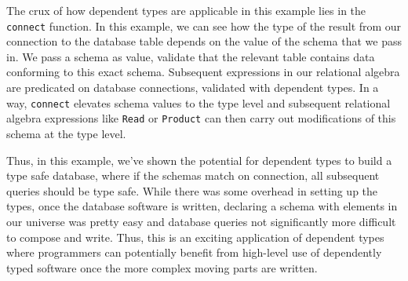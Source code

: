 The crux of how dependent types are applicable in this example lies in the
\texttt{connect} function. In this example, we can see how the type of the
result from our connection to the database table depends on the value of the
schema that we pass in. We pass a schema as value, validate that the relevant
table contains data conforming to this exact schema. Subsequent expressions in
our relational algebra are predicated on database connections, validated with
dependent types. In a way, \texttt{connect} elevates schema values to the type
level and subsequent relational algebra expressions like \texttt{Read} or
\texttt{Product} can then carry out modifications of this schema at the type
level. 

Thus, in this example, we've shown the potential for dependent types to build a
type safe database, where if the schemas match on connection, all subsequent
queries should be type safe. While there was some overhead in setting up the
types, once the database software is written, declaring a schema with elements
in our universe was pretty easy and database queries not significantly more
difficult to compose and write. Thus, this is an exciting application of
dependent types where programmers can potentially benefit from high-level use of
dependently typed software once the more complex moving parts are written. 